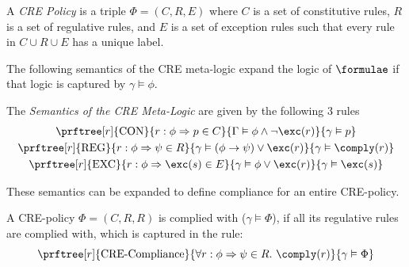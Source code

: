 
\begin{definition}
    \label{def:cre-policy}
    A \emph{CRE Policy} is a triple $\Phi = \left(C, R, E\right)$
    where $C$ is a set of constitutive rules, $R$ is a set of regulative
    rules, and $E$ is a set of exception rules such that
    every rule in $C \cup R \cup E$ has a unique label.
\end{definition}

The following semantics of the CRE meta-logic expand the logic of $\formulae$ if that
logic is captured by $\gamma \vDash \phi$.

\begin{definition}
    \label{def:cre-semantics}
    The \emph{Semantics of the CRE Meta-Logic} are given by the following 3 rules
    \begin{gather*}
        \prftree[r]{\text{CON}}
            {r: \phi \Rightarrow p \in C}{\Gamma \vDash \phi \wedge \neg \exc(r)}
            {\gamma \vDash p} \\
        \prftree[r]{\text{REG}}
            {r: \phi \Rightarrow \psi \in R}{\gamma \vDash (\phi \to \psi) \vee \exc(r)}
            {\gamma \vDash \comply(r)} \\
        \prftree[r]{\text{EXC}}
            {r: \phi \Rightarrow \exc(s) \in E}{\gamma \vDash \phi \vee \exc(r)}
            {\gamma \vDash \exc(s)}
    \end{gather*}
\end{definition}

These semantics can be expanded to define compliance for an entire CRE-policy.

\begin{definition}
    \label{cre-compliance}
    A CRE-policy $\Phi = \left(C,R,R \right)$ is complied with ($\gamma \vDash \Phi$), if
    all its regulative rules are complied with, which is captured in the rule:
    \begin{equation*}
        \prftree[r]{\text{CRE-Compliance}}
            {\forall r: \phi \Rightarrow \psi \in R.\ \comply(r)}
            {\gamma \vDash \Phi}
    \end{equation*}
\end{definition}

